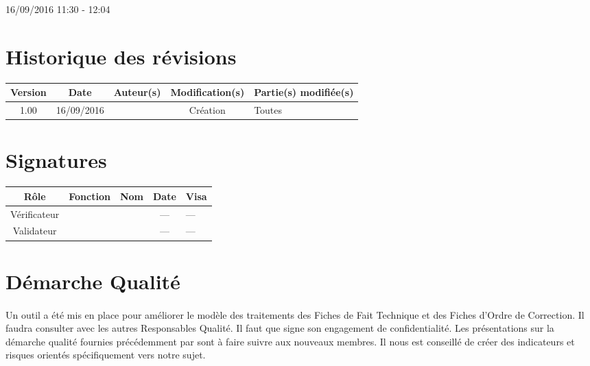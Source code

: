 \documentclass [a4paper] {article}
\begin{document}
\rhead{}

16/09/2016
\hfill   
\hfill 	11:30 - 12:04 				%



\section*{Historique des révisions}
\begin{center}
			\begin{tabular}{| c | c | c | c | p{4cm} |}
				\hline
				\rowcolor{Gray}
				Version & Date & Auteur(s) & Modification(s) & Partie(s) modifiée(s)		 \\
				\hline
				1.00 & 16/09/2016 & \Kafui & Création & Toutes \\
		\hline		
			\end{tabular}
		\end{center}

\section*{Signatures}

		\begin{center}
			\begin{tabular}{| c | c | c | c | p{4cm} |}
				\hline
				\rowcolor{Gray}
				Rôle & Fonction & Nom & Date & Visa		 \\
				\hline
				Vérificateur & \RGC & \Melissa & --- & --- \\[30pt]
				\hline
				Validateur & \CP & \Pierre & --- & --- \\[30pt]	
				\hline
			\end{tabular}
		\end{center}


\section{Démarche Qualité}
\paragraph*{}
Un outil a été mis en place pour améliorer le modèle des traitements des Fiches de Fait Technique et des Fiches d'Ordre de Correction. Il faudra consulter avec les autres Responsables Qualité. Il faut que \Juliana{} signe son engagement de confidentialité. Les présentations sur la démarche qualité fournies précédemment par \nomTuteurQualite{} sont à faire suivre aux nouveaux membres. Il nous est conseillé de créer des indicateurs et risques orientés spécifiquement vers notre sujet. 
\end{document}
